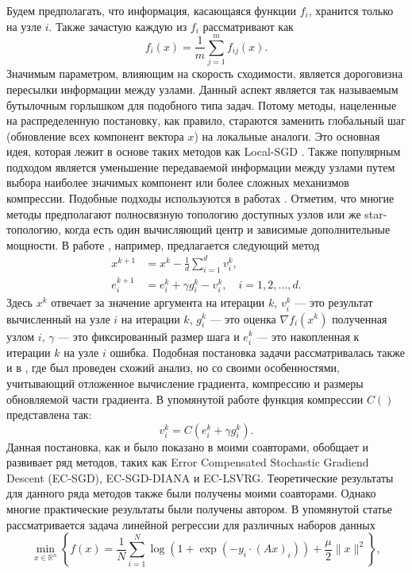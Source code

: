   Будем предполагать, что информация, касающаяся функции $f_i$, хранится только на узле $i$. Также зачастую каждую из $f_i$ рассматривают как
  $$
    f_i(x) = \frac{1}{m} \sum_{j=1}^m f_{ij}(x).
  $$ 
  Значимым параметром, влияющим на скорость сходимости, является дороговизна пересылки информации между узлами. Данный аспект является так называемым бутылочным горлышком для подобного типа задач. Потому методы, нацеленные на распределенную постановку, как правило, стараются заменить глобальный шаг (обновление всех компонент вектора $x$) на локальные аналоги. Это основная идея, которая лежит в основе таких методов как Local-SGD \cite{Stich2019LocalSC}. Также популярным подходом является уменьшение передаваемой информации между узлами путем выбора наиболее значимых компонент или более сложных механизмов компрессии. Подобные подходы используются в работах \cite{qlsgd, qsgd, err_fdbk}. Отметим, что многие методы предполагают полносвязную топологию доступных узлов или же star-топологию, когда есть один вычисляющий центр и зависимые дополнительные мощности. 
  В работе \cite{GorbunovKMR20}, например, предлагается следующий метод
  $$
  \begin{aligned} 
    x^{k+1} &=x^k-\frac{1}{d} \sum_{i=1}^d v_i^k, \\ 
    e_i^{k+1} &=e_i^k + \gamma g_i^k - v_i^k, \quad i=1,2, \ldots, d . 
  \end{aligned}
  $$
  Здесь $x^k$ отвечает за значение аргумента на итерации $k$, $v_i^k$ --- это результат вычисленный на узле $i$ на итерации $k$, $g_i^k$ --- это оценка $\nabla f_i(x^k)$ полученная узлом $i$, $\gamma$ --- это фиксированный размер шага и $e_i^k$ --- это накопленная к итерации $k$ на узле $i$ ошибка.  Подобная постановка задачи рассматривалась также и в \cite{err_fdbk}, где был проведен схожий анализ, но со своими особенностями, учитывающий отложенное вычисление градиента, компрессию и размеры обновляемой части градиента.
  В упомянутой работе функция компрессии $C()$ представлена так:
  $$
    v_i^k = C(e_i^k + \gamma g_i^k).
  $$
  Данная постановка, как и было показано в \cite{GorbunovKMR20} моими соавторами, обобщает и развивает ряд методов, таких как Error Compensated Stochastic Gradiend Descent (EC-SGD), EC-SGD-DIANA и EC-LSVRG. Теоретические результаты для данного ряда методов также были получены моими соавторами. Однако многие практические результаты были получены автором. В упомянутой статье рассматривается задача линейной регрессии для различных наборов данных
  $$
    \min_{x \in \mathbb{R}^n}\left\{ f(x) = \frac{1}{N} \sum_{i=1}^N \log \left(1+\exp \left(- y_i \cdot(A x)_i\right)\right) + \frac{\mu}{2}\|x\|^2 \right\},
  $$
